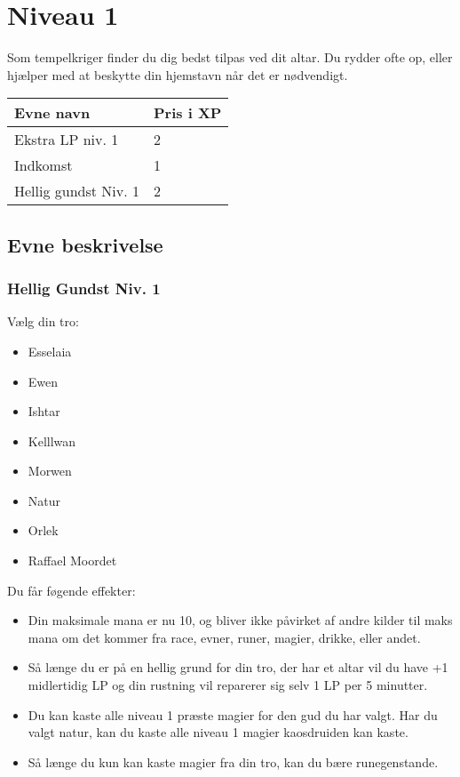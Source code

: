 \chapter{Niveau 1}
Som tempelkriger finder du dig bedst tilpas ved dit altar. Du rydder ofte op, eller hjælper med at beskytte din hjemstavn når det er nødvendigt.

\begin{table}[H]
    \centering
    \begin{tabular}{|p{}|p{}|}
    \rowcolor{cerulean!80}\hline
        Evne navn & Pris i XP \\\hline
        Ekstra LP niv. 1 &2\\\hline 
        Indkomst & 1\\\hline
        Hellig gundst Niv. 1 &2\\\hline
    \end{tabular}
\end{table}

\section{Evne beskrivelse}







\subsection{Hellig Gundst Niv. 1}
Vælg din tro: 
\begin{itemize}
    \item Esselaia
    \item Ewen
    \item Ishtar
    \item Kelllwan
    \item Morwen
    \item Natur
    \item Orlek
    \item Raffael Moordet
\end{itemize}

Du får føgende effekter:
\begin{itemize}
    \item Din maksimale mana er nu 10, og bliver ikke påvirket af andre kilder til maks mana om det kommer fra race, evner, runer, magier, drikke, eller andet.
    \item Så længe du er på en hellig grund for din tro, der har et altar vil du have +1 midlertidig LP og din rustning vil reparerer sig selv 1 LP per 5 minutter.
    \item Du kan kaste alle niveau 1 præste magier for den gud du har valgt. Har du valgt natur, kan du kaste alle niveau 1 magier kaosdruiden kan kaste.
    \item Så længe du kun kan kaste magier fra din tro, kan du bære runegenstande.
\end{itemize}